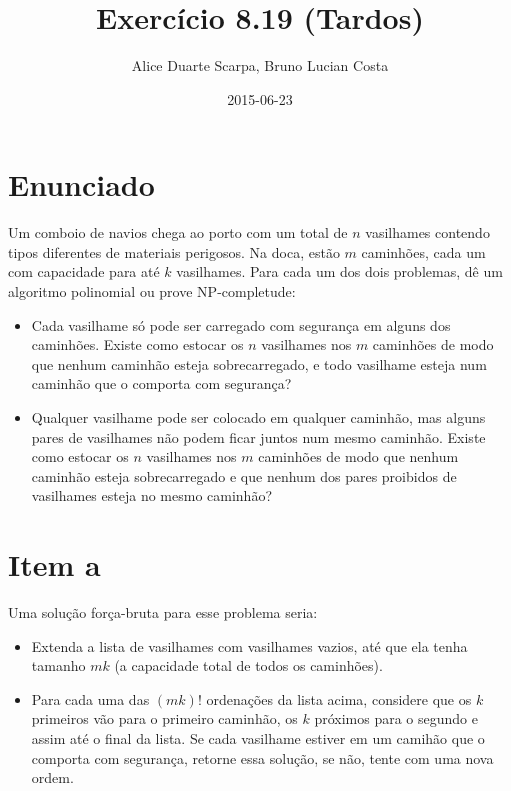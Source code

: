 \documentclass[11pt]{article}
\author{Alice Duarte Scarpa, Bruno Lucian Costa}
\date{2015-06-23}
\title{Exercício 8.19 (Tardos)}
\begin{document}
\maketitle

\section{Enunciado}
\label{sec-1}

Um comboio de navios chega ao porto com um total de $n$ vasilhames
contendo tipos diferentes de materiais perigosos.
Na doca, estão $m$ caminhões, cada um com capacidade para até $k$
vasilhames.  Para cada um dos dois problemas, dê um algoritmo
polinomial ou prove NP-completude:


\begin{itemize}
\item Cada vasilhame só pode ser carregado com segurança em alguns
dos caminhões. Existe como estocar os $n$ vasilhames nos $m$
caminhões de modo que nenhum caminhão esteja sobrecarregado, e
todo vasilhame esteja num caminhão que o comporta com segurança?

\item Qualquer vasilhame pode ser colocado em qualquer caminhão,
mas alguns pares de vasilhames não podem ficar juntos num mesmo
caminhão. Existe como estocar os $n$ vasilhames nos $m$
caminhões de modo que nenhum caminhão esteja sobrecarregado e
que nenhum dos pares proibidos de vasilhames esteja no mesmo
caminhão?
\end{itemize}

\section{Item a}
\label{sec-2}

Uma solução força-bruta para esse problema seria:

\begin{itemize}
\item Extenda a lista de vasilhames com vasilhames vazios, até que ela
tenha tamanho  $mk$ (a capacidade total de todos os caminhões).
\item Para cada uma das $(mk)!$ ordenações da lista acima, considere que
os $k$ primeiros vão para o primeiro caminhão, os $k$ próximos para
o segundo e assim até o final da lista. Se cada vasilhame estiver em
um camihão que o comporta com segurança, retorne essa solução, se
não, tente com uma nova ordem.
\end{itemize}
\end{document}
